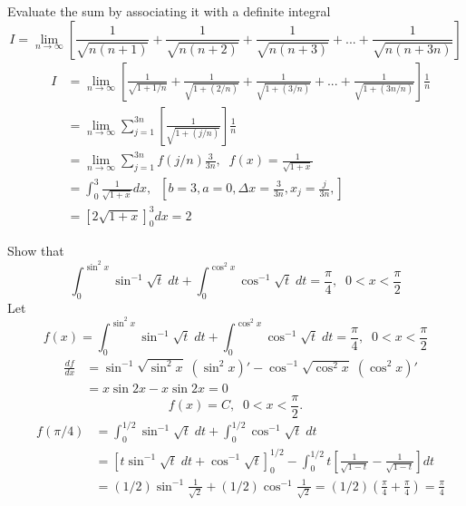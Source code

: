 \documentclass{article}
\begin{document}
 Evaluate the sum by associating
it with a definite integral
$$
I = \lim_{n \to \infty} \left[ \frac{1}{\sqrt{n(n+1)}}
+\frac{1}{\sqrt{n(n+2)}}+\frac{1}{\sqrt{n(n+3)}}+...+\frac{1}{\sqrt{n(n+3n)}}
\right]
$$
\begin{eqnarray}
& I & = \lim_{n \to \infty} \left[ \frac{1}{\sqrt{1+ 1/n}}
+\frac{1}{\sqrt{1+(2/n)}}+\frac{1}{\sqrt{1+(3/n)}}+...+\frac{1}{\sqrt{1+(3n/n)}}
\right]  \frac{1}{n}   \nonumber\\
&   & = \lim_{n \to \infty} \sum_{j=1}^{3n} \left[
\frac{1}{\sqrt{1+ (j/n)}} \right]  \frac{1}{n}   \nonumber\\
&   & = \lim_{n \to \infty} \sum_{j=1}^{3n} f \left( {j}/{n}
\right)  \frac{3}{3n}, \;\; f(x)= \frac{1}{\sqrt{1+ x}}
\nonumber\\
&   & = \int_0^3 \frac{1}{\sqrt{1+ x}} dx, \;\; \left[b=3, a=0,
\Delta
x=\frac{3}{3n}, x_j=\frac{j}{3n}, \right] \; \nonumber\\
&   & =\left[ 2 \sqrt{1+ x} \right]_0^{3} dx=2  \nonumber
\end{eqnarray}


\vspace{0.2in}


 Show that
$$
\int_0^{ \sin^2 x} \sin^{-1} \sqrt{t} \; dt +\int_0^{ \cos^2 x}
\cos^{-1} \sqrt{t} \; dt = \frac{\pi}{4}, \;\;  0 < x <
\frac{\pi}{2}
$$
Let
$$
f(x)=\int_0^{ \sin^2 x} \sin^{-1} \sqrt{t} \; dt +\int_0^{ \cos^2
x} \cos^{-1} \sqrt{t} \; dt = \frac{\pi}{4}, \;\;  0 < x <
\frac{\pi}{2}
$$
\begin{eqnarray}
& \frac{d f}{d x} & = \sin^{-1}\sqrt{ \sin^2 x } \; (\sin^2 x)' -
\cos^{-1}\sqrt{ \cos^2 x } \; (\cos^2 x)'   \nonumber\\
&          & = x  \sin 2 x -x  \sin 2 x =0    \nonumber
\end{eqnarray}
$$
f(x)=C, \;\;  0 < x < \frac{\pi}{2}.
$$
\begin{eqnarray}
&  f(\pi/4) & =\int_0^{1/2} \sin^{-1} \sqrt{t} \; dt +\int_0^{1/2}
\cos^{-1} \sqrt{t} \; dt  \nonumber\\
&          & =\left[ t \sin^{-1} \sqrt{t} \; dt + \cos^{-1}
\sqrt{t}\right]_0^{1/2}- \int_0^{1/2} t\left[\frac{1}{ \sqrt{1-t}
} - \frac{1}{ \sqrt{1-t}}  \right] dt  \nonumber\\
&          & =  (1/2) \sin^{-1} \frac{1}{ \sqrt{2}}  + (1/2)
\cos^{-1} \frac{1}{ \sqrt{2}} = (1/2) \left( \frac{\pi}{ 4} +
\frac{\pi}{ 4} \right) = \frac{\pi}{ 4}  \nonumber
\end{eqnarray}
\end{document}
